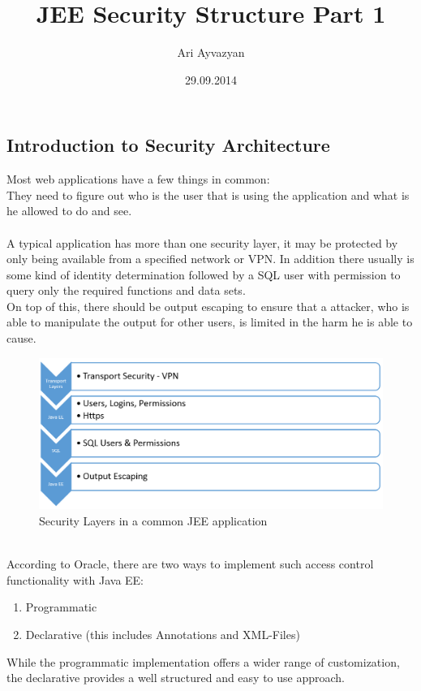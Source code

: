 \documentclass[12pt,a4paper]{report}
\date{29.09.2014}
\author{Ari Ayvazyan}
\title{JEE Security Structure Part 1}
\begin{document}
\maketitle
\tableofcontents


\chapter{\MyTitle}


\section{Introduction to Security Architecture}
Most web applications have a few things in common:\\
They need to figure out who is the user that is using the application and what is he allowed to do and see.\\\\
A typical application has more than one security layer, it may be protected by only being available from a specified network or VPN. In addition there usually is some kind of identity determination followed by a SQL user with permission to query only the required functions and data sets.\\
On top of this, there should be output escaping to ensure that a attacker, who is able to manipulate the output for other users, is limited in the harm he is able to cause.
\begin{figure}[h]
\centering
\includegraphics[width=1\linewidth]{res/SecurityLayers}
\caption{Security Layers in a common JEE application}
\label{fig:SecurityLayers}

\end{figure}
\\According to Oracle\cite{oracleDoc}, there are two ways to implement such access control functionality with Java EE:
\begin{enumerate}
	\item Programmatic
	\item Declarative (this includes Annotations and XML-Files)
\end{enumerate}
While the programmatic implementation offers a wider range of customization, the declarative provides a well structured and easy to use approach.\\
\end{document}
